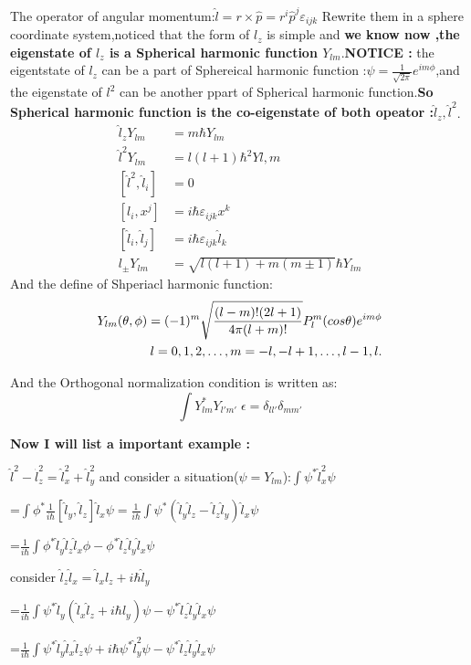 \documentclass{article}
\begin{document}
The operator of angular momentum:$\hat l=r\times\hat p=r^i\hat p^j\varepsilon_{ijk} $
Rewrite them in a sphere coordinate system,noticed that the form of $l_z$ is simple and \textbf{we know now ,the eigenstate of $l_z$ is a Spherical harmonic function $Y_{lm}$}.\textbf{NOTICE :} the eigentstate of $l_z$ can be a part of Sphereical harmonic function :$\psi=\frac1{\sqrt{2\pi}}e^{im\phi}$,and the eigenstate of $l^2$ can be another ppart of Spherical harmonic function.\textbf{So Spherical harmonic function is the co-eigenstate of both opeator :$\hat l_z,\hat l^2$}.
\begin{align}
  \hat l_zY_{lm}&=m\hbar Y_{lm} \\
  \hat l^2Y_{lm}&=l(l+1)\hbar^2Y{l,m} \\
  [\hat l^2,\hat l_i]&=0 \\
  [l_i,x^j]&=i\hbar\varepsilon_{ijk}x^{k} \\
  [\hat l_i,\hat l_j]&=i\hbar\varepsilon_{ijk}\hat l_k\\
                     l_{\pm}Y_{lm}&=\sqrt{l(l+1)+m(m\pm1)}\hbar Y_{lm}
\end{align}
And the define of Shperiacl harmonic function:
\begin{align}
  Y_{lm}(\theta,\phi)=(-1)^m\sqrt{\frac{(l-m)!(2l+1)}{4\pi(l+m)!}}P_l^m(cos\theta)e^{im\phi}\\
   l=0,1,2,\dots,m=-l,-l+1,\dots,l-1,l.\notag
\end{align}

And the Orthogonal normalization condition is written as:
\begin{equation}
  \int Y^*_{lm}Y_{l'm'}\;\epsilon=\delta_{ll'}\delta_{mm'}
\end{equation}

\textbf{Now I will list a important example :}

$\hat l^2 -\hat l_z^2=\hat l_x^2+\hat l_y^2$
and consider a situation($\psi=Y_{lm}$):$\int \psi^*\hat l_x^2\psi$

=$\int \phi^*\frac1{i\hbar}[\hat l_y,\hat l_z]\hat l_x\psi=\frac1{i\hbar}\int \psi^*(\hat l_y\hat l_z-\hat l_z\hat l_y)\hat l_x\psi$

=$\frac1{i\hbar}\int \phi^*\hat l_y\hat l_z\hat l_x \phi-\phi^*\hat l_z\hat l_y\hat l_x\psi$

consider $\hat l_z\hat l_x=\hat l_x\hat l_z+i\hbar\hat l_y$

=$\frac1{i\hbar}\int \psi^* \hat l_y(\hat l_x\hat l_z+i\hbar\hat l_y)\psi-\psi^*\hat l_z\hat l_y\hat l_x\psi$

=$\frac1{i\hbar}\int \psi^*\hat l_y\hat l_x\hat l_z\psi+i\hbar\psi^*\hat l_y^2\psi-\psi^*\hat l_z\hat l_y\hat l_x\psi$
\end{document}
